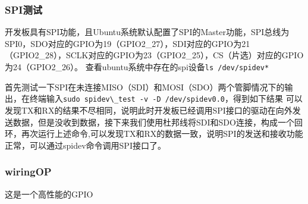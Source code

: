 \subsubsection{SPI测试}\label{spiux6d4bux8bd5}

开发板具有SPI功能，且Ubuntu系统默认配置了SPI的Master功能，SPI总线为SPI0，SDO对应的GPIO为19（GPIO2\_27），SDI对应的GPIO为21（GPIO2\_28），SCLK对应的GPIO为23（GPIO2\_25），CS（片选）对应的GPIO为24（GPIO2\_26）。
查看ubuntu系统中存在的spi设备\passthrough{\lstinline!ls /dev/spidev*!}

首先测试一下SPI在未连接MISO（SDI）和MOSI（SDO）两个管脚情况下的输出，在终端输入\passthrough{\lstinline!sudo spidev\_test -v -D /dev/spidev0.0!}，得到如下结果
可以发现TX和RX的结果不尽相同，说明此时开发板已经调用SPI接口的驱动在向外发送数据，但是没收到数据，接下来我们使用杜邦线将SDI和SDO连接，构成一个回环，再次运行上述命令,可以发现TX和RX的数据一致，说明SPI的发送和接收功能正常，可以通过spidev命令调用SPI接口了。

\subsubsection{wiringOP}\label{wiringop}

这是一个高性能的GPIO
